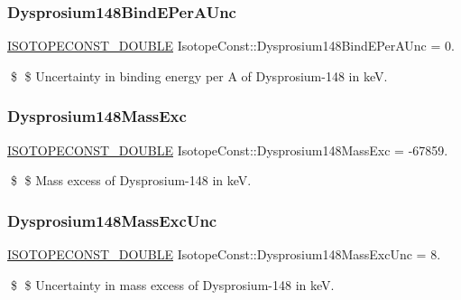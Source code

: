 \subsubsection{\texorpdfstring{Dysprosium148\+Bind\+E\+Per\+A\+Unc}{Dysprosium148BindEPerAUnc}}
{\footnotesize\ttfamily \mbox{\hyperlink{group___isotope_const-_macros_ga8f45a7272ce02c0b4c65c44636ed719a}{I\+S\+O\+T\+O\+P\+E\+C\+O\+N\+S\+T\+\_\+\+D\+O\+U\+B\+LE}} Isotope\+Const\+::\+Dysprosium148\+Bind\+E\+Per\+A\+Unc = 0.}

\$ \$ Uncertainty in binding energy per A of Dysprosium-\/148 in keV. \mbox{\label{group___isotope_const-_dysprosium-_dy148_gaa3f8ec8c12ccd1b03621b75e172d604c}} 
\subsubsection{\texorpdfstring{Dysprosium148\+Mass\+Exc}{Dysprosium148MassExc}}
{\footnotesize\ttfamily \mbox{\hyperlink{group___isotope_const-_macros_ga8f45a7272ce02c0b4c65c44636ed719a}{I\+S\+O\+T\+O\+P\+E\+C\+O\+N\+S\+T\+\_\+\+D\+O\+U\+B\+LE}} Isotope\+Const\+::\+Dysprosium148\+Mass\+Exc = -\/67859.}

\$ \$ Mass excess of Dysprosium-\/148 in keV. \mbox{\label{group___isotope_const-_dysprosium-_dy148_gaede7719275d7289bdd662c2d49dc738f}} 
\subsubsection{\texorpdfstring{Dysprosium148\+Mass\+Exc\+Unc}{Dysprosium148MassExcUnc}}
{\footnotesize\ttfamily \mbox{\hyperlink{group___isotope_const-_macros_ga8f45a7272ce02c0b4c65c44636ed719a}{I\+S\+O\+T\+O\+P\+E\+C\+O\+N\+S\+T\+\_\+\+D\+O\+U\+B\+LE}} Isotope\+Const\+::\+Dysprosium148\+Mass\+Exc\+Unc = 8.}

\$ \$ Uncertainty in mass excess of Dysprosium-\/148 in keV. \mbox{\label{group___isotope_const-_dysprosium-_dy148_gafbf54113d3f076e979be3488b0cadd43}} 
